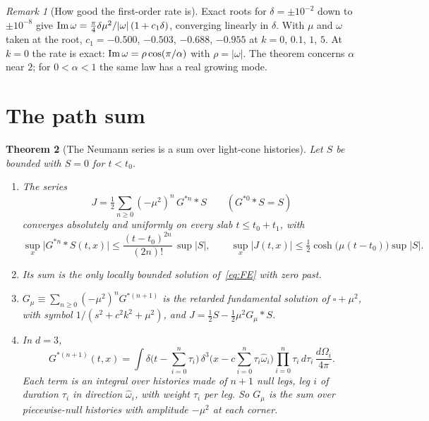 \documentclass[11pt]{amsart}
\newtheorem{theorem}{Theorem}[section]
\theoremstyle{definition}
\theoremstyle{remark}
\newtheorem{remark}[theorem]{Remark}
\begin{document}
\begin{remark}[How good the first-order rate is]\label{rem:near2order}
Exact roots for $\delta=\pm10^{-2}$ down to $\pm10^{-8}$ give ${\rm Im}\,\omega=\tfrac\pi4\delta\mu^2/\lvert\omega\rvert\,(1+c_1\delta)$, converging linearly in $\delta$. With $\mu$ and $\omega$ taken at the root, $c_1=-0.500$, $-0.503$, $-0.688$, $-0.955$ at $k=0$, $0.1$, $1$, $5$. At $k=0$ the rate is exact: ${\rm Im}\,\omega=\rho\cos(\pi/\alpha)$ with $\rho=\lvert\omega\rvert$. The theorem concerns $\alpha$ near $2$; for $0<\alpha<1$ the same law has a real growing mode.
\end{remark}

\section{The path sum}

\begin{theorem}[The Neumann series is a sum over light-cone histories]\label{thm:pathsum}
Let $S$ be bounded with $S=0$ for $t<t_0$.
\begin{enumerate}
\item The series
\[
J=\tfrac12\sum_{n\ge0}(-\mu^2)^n\,G^{*n}*S\qquad(G^{*0}*S=S)
\]
converges absolutely and uniformly on every slab $t\le t_0+t_1$, with
\[
\sup_x\big\lvert G^{*n}*S(t,x)\big\rvert\le\frac{(t-t_0)^{2n}}{(2n)!}\,\sup\lvert S\rvert,\qquad \sup_x\lvert J(t,x)\rvert\le\tfrac12\cosh\big(\mu(t-t_0)\big)\sup\lvert S\rvert .
\]
\item Its sum is the only locally bounded solution of~\eqref{eq:FE} with zero past.
\item $G_\mu\equiv\sum_{n\ge0}(-\mu^2)^nG^{*(n+1)}$ is the retarded fundamental solution of $\square+\mu^2$, with symbol $1/(s^2+c^2k^2+\mu^2)$, and $J=\tfrac12S-\tfrac12\mu^2G_\mu*S$.
\item In $d=3$,
\[
G^{*(n+1)}(t,x)=\int\delta\Big(t-\sum_{i=0}^n\tau_i\Big)\,\delta^3\Big(x-c\sum_{i=0}^n\tau_i\hat\omega_i\Big)\prod_{i=0}^n\tau_i\,d\tau_i\,\frac{d\Omega_i}{4\pi}.
\]
Each term is an integral over histories made of $n+1$ null legs, leg $i$ of duration $\tau_i$ in direction $\hat\omega_i$, with weight $\tau_i$ per leg. So $G_\mu$ is the sum over piecewise-null histories with amplitude $-\mu^2$ at each corner.
\end{enumerate}
\end{theorem}
\end{document}
